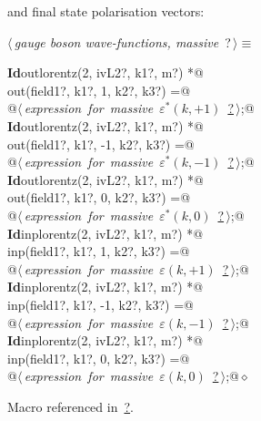 \documentclass[a4paper,12pt]{amsart}
\renewcommand{\NWtarget}[2]{\hypertarget{#1}{#2}}
\renewcommand{\NWlink}[2]{\hyperlink{#1}{#2}}
\renewcommand{\NWtxtMacroRefIn}{Macro referenced in}
\renewcommand{\NWsep}{${\diamond}$}
\begin{document}
and final state polarisation vectors:
\begin{flushleft} \small\label{scrap30}\raggedright\small
\NWtarget{nuweb?}{} $\langle\,${\it gauge boson wave-functions, massive}\nobreak\ {\footnotesize {?}}$\,\rangle\equiv$
\vspace{-1ex}
\begin{list}{}{} \item
\mbox{}\verb@@\hbox{\sffamily\bfseries Id}\verb@ outlorentz(2, ivL2?, k1?, m?) *@\\
\mbox{}\verb@      out(field1?, k1?,  1, k2?, k3?) =@\\
\mbox{}\verb@   @\hbox{$\langle\,${\it expression for massive $\varepsilon^\ast(k, +1)$}\nobreak\ {\footnotesize \NWlink{nuweb?}{?}}$\,\rangle$}\verb@;@\\
\mbox{}\verb@@\hbox{\sffamily\bfseries Id}\verb@ outlorentz(2, ivL2?, k1?, m?) *@\\
\mbox{}\verb@      out(field1?, k1?, -1, k2?, k3?) =@\\
\mbox{}\verb@   @\hbox{$\langle\,${\it expression for massive $\varepsilon^\ast(k, -1)$}\nobreak\ {\footnotesize \NWlink{nuweb?}{?}}$\,\rangle$}\verb@;@\\
\mbox{}\verb@@\hbox{\sffamily\bfseries Id}\verb@ outlorentz(2, ivL2?, k1?, m?) *@\\
\mbox{}\verb@      out(field1?, k1?,  0, k2?, k3?) =@\\
\mbox{}\verb@   @\hbox{$\langle\,${\it expression for massive $\varepsilon^\ast(k, 0)$}\nobreak\ {\footnotesize \NWlink{nuweb?}{?}}$\,\rangle$}\verb@;@\\
\mbox{}\verb@@\hbox{\sffamily\bfseries Id}\verb@ inplorentz(2, ivL2?, k1?, m?) *@\\
\mbox{}\verb@      inp(field1?, k1?,  1, k2?, k3?) =@\\
\mbox{}\verb@   @\hbox{$\langle\,${\it expression for massive $\varepsilon(k, +1)$}\nobreak\ {\footnotesize \NWlink{nuweb?}{?}}$\,\rangle$}\verb@;@\\
\mbox{}\verb@@\hbox{\sffamily\bfseries Id}\verb@ inplorentz(2, ivL2?, k1?, m?) *@\\
\mbox{}\verb@      inp(field1?, k1?, -1, k2?, k3?) =@\\
\mbox{}\verb@   @\hbox{$\langle\,${\it expression for massive $\varepsilon(k, -1)$}\nobreak\ {\footnotesize \NWlink{nuweb?}{?}}$\,\rangle$}\verb@;@\\
\mbox{}\verb@@\hbox{\sffamily\bfseries Id}\verb@ inplorentz(2, ivL2?, k1?, m?) *@\\
\mbox{}\verb@      inp(field1?, k1?,  0, k2?, k3?) =@\\
\mbox{}\verb@   @\hbox{$\langle\,${\it expression for massive $\varepsilon(k, 0)$}\nobreak\ {\footnotesize \NWlink{nuweb?}{?}}$\,\rangle$}\verb@;@{\NWsep}
\end{list}
\vspace{-1.5ex}
\footnotesize
\begin{list}{}{\setlength{\itemsep}{-\parsep}\setlength{\itemindent}{-\leftmargin}}
\item \NWtxtMacroRefIn\ \NWlink{nuweb?}{?}.


\end{list}
\end{flushleft}
\end{document}
